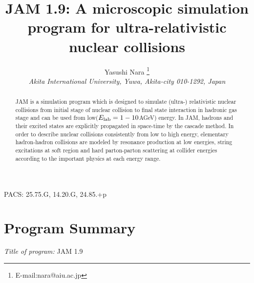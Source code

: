 \documentclass[]{article}
\def\VERSION{1.9}
\newcommand{\Elab}{\mbox{$E_{\rm lab}$}}
\begin{document}
\sloppy


\title{\bf JAM \VERSION:
A microscopic simulation program
 for ultra-relativistic nuclear collisions
}
\author{Yasushi Nara \thanks{E-mail:nara@aiu.ac.jp}\\
  {\it Akita International University, Yuwa, Akita-city 010-1292, Japan}
}


\date{}
\maketitle

\begin{abstract}
\noindent
JAM is a simulation program which
 is designed to simulate (ultra-) relativistic nuclear collisions
 from initial stage of nuclear collision to final state interaction
 in hadronic gas stage
 and
 can be used from low($\Elab=1-10$AGeV) energy.
In JAM, hadrons and their excited states
 are explicitly propagated in space-time by the cascade method.
In order to describe nuclear collisions consistently from low to high energy,
  elementary hadron-hadron collisions are modeled by resonance production
  at low energies, string excitations at soft region and
  hard parton-parton scattering at collider energies according to
  the important physics at each energy range.
\end{abstract}

PACS: 25.75.G, 14.20.G, 24.85.+p


\section{Program Summary}

{\noindent\em Title of program:} JAM \VERSION\\
\end{document}
